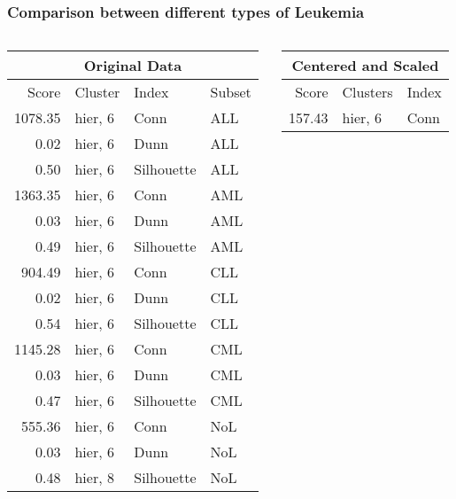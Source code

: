 \documentclass[10pt,dvipsnames,table]{beamer}
\begin{document}
\begin{frame}
\frametitle{Comparison between different types of Leukemia}
\begin{columns}
\begin{column}{.5\textwidth}
\begin{table}[ht]
\centering
{\footnotesize
{}
\begin{tabular}{rlll}
\hline
\multicolumn{4}{c}{Original Data} \\
  \hline
 Score & Cluster & Index & Subset \\ 
  \hline
  1078.35 & hier, 6 & Conn & ALL \\ 
  0.02 & hier, 6 & Dunn & ALL \\ 
  0.50 & hier, 6 & Silhouette & ALL \\ 
  1363.35 & hier, 6 & Conn & AML \\ 
  0.03 & hier, 6 & Dunn & AML \\ 
  0.49 & hier, 6 & Silhouette & AML \\ 
  904.49 & hier, 6 & Conn & CLL \\ 
  0.02 & hier, 6 & Dunn & CLL \\ 
  0.54 & hier, 6 & Silhouette & CLL \\ 
  1145.28 & hier, 6 & Conn & CML \\ 
  0.03 & hier, 6 & Dunn & CML \\ 
  0.47 & hier, 6 & Silhouette & CML \\ 
  555.36 & hier, 6 & Conn & NoL \\ 
  0.03 & hier, 6 & Dunn & NoL \\ 
  0.48 & hier, 8 & Silhouette & NoL \\ 
   \hline
\end{tabular}
}
\end{table}
\end{column}
\begin{column}{.5\textwidth}
\pause
\begin{table}[ht]
\centering
{\footnotesize
{}
\begin{tabular}{rll}
\hline
\multicolumn{3}{c}{Centered and Scaled} \\
\hline
Score & Clusters & Index \\ 
  \hline
157.43 & hier, 6 & Conn \\ 

\end{tabular}}
\end{table}
\end{column}
\end{columns}
\end{frame}
\end{document}
